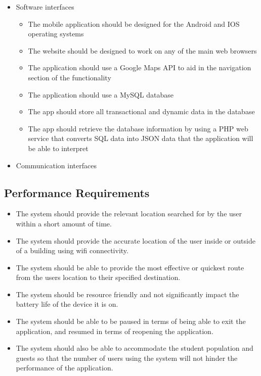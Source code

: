 \documentclass{article}
\begin{document}
\begin{itemize}
			\item Software interfaces
				\begin{itemize}
					\item The mobile application should be designed for the Android and IOS operating systems
					\item The website should be designed to work on any of the main web browsers
					\item The application should use a Google Maps API to aid in the navigation section of the functionality
					\item The application should use a MySQL database
					\item The app should store all transactional and dynamic data in the database
					\item The app should retrieve the database information by using a PHP web service that converts SQL data into JSON data that the application will be able to interpret
				\end{itemize}
				
			\item Communication interfaces
			\end{itemize}
		
		\subsection{Performance Requirements}\label{sec:performance-requirements}
			\begin{itemize}
			\small
			\item The system should provide the relevant location searched for by the user within a short amount of time.
			\item The system should provide the accurate location of the user inside or outside of a building using wifi connectivity.
			\item The system should be able to provide the most effective or quickest route from the users location to their specified destination.
			\item The system should be resource friendly and not significantly impact the battery life of the device it is on.
			\item The system should be able to be paused in terms of being able to exit the application, and resumed in terms of reopening the application.
			\item The system should also be able to accommodate the student population and guests so that the number of users using the system will not hinder the performance of the application.
			\end{itemize}
		
\end{document}

